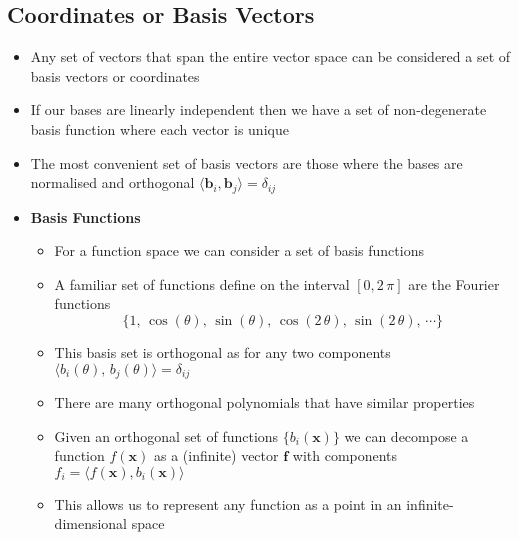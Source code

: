 \documentclass[11pt]{article}
\begin{document}
\subsection{Coordinates or Basis Vectors}
\label{sec:orgc3f2292}
\begin{itemize}
\item Any set of vectors that span the entire vector space can be
considered a set of basis vectors or coordinates
\item If our bases are linearly independent then we have a set of
non-degenerate basis function where each vector is unique
\item The most convenient set of basis vectors are those where the
bases are normalised and orthogonal
\(\langle\bm{b}_i,\bm{b}_j\rangle=\delta_{ij}\)
\item \textbf{Basis Functions}
\begin{itemize}
\item For a function space we can consider a set of basis functions
\item A familiar set of functions define on the interval \([0,2\,\pi]\)
are the Fourier functions 
$$ \{1,\, \cos(\theta),\, \sin(\theta),\, \cos(2\,\theta),\,
       \sin(2\,\theta),\, \cdots\} $$
\item This basis set is orthogonal as for any two components \(\langle
       b_i(\theta),\,b_j(\theta)\rangle = \delta_{ij}\)
\item There are many orthogonal polynomials that have similar properties
\item Given an orthogonal set of functions \(\{b_i(\bm{x})\}\) we can decompose a function \(f(\bm{x})\)
as a (infinite) vector \(\bm{f}\) with components \(f_i = \langle f(\bm{x}),b_i(\bm{x})\rangle\)
\item This allows us to represent any function as a point in an infinite-dimensional space
\end{itemize}
\end{itemize}
\end{document}
